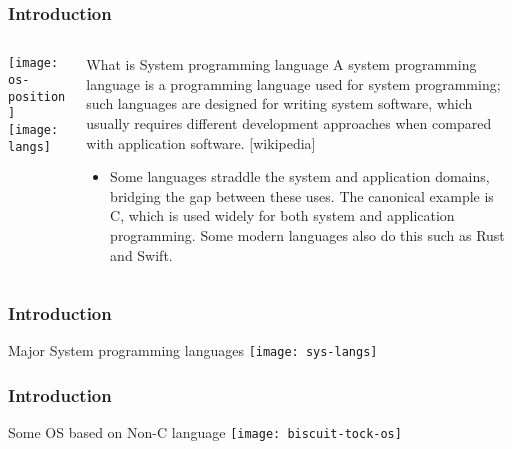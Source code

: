\begin{frame}[plain]
	\frametitle{Introduction}
	
	
	
	\begin{columns}
		
		\begin{column}{.4\textwidth}
			
			\texttt{[image: os-position]}
			\texttt{[image: langs]}
		\end{column}
		
		\begin{column}{.6\textwidth}
			
			\begin{block}{What is System programming language}
				A system programming language is a programming language used for system programming; such languages are designed for writing system software, which usually requires different development approaches when compared with application software.   [wikipedia]
			\end{block} 
			
			
			\begin{itemize}
				\item Some languages straddle the system and application domains, bridging the gap between these uses. The canonical example is C, which is used widely for both system and application programming. Some modern languages also do this such as Rust and Swift.
				
			\end{itemize}
			
			
		\end{column}
		
		
	\end{columns}
	
	
\end{frame}


\begin{frame}[plain]
	\frametitle{Introduction}
	
	\centering
	Major System programming languages
	\texttt{[image: sys-langs]}
\end{frame}

\begin{frame}[plain]
	\frametitle{Introduction}
	
	\centering
	Some OS based on Non-C language
	\texttt{[image: biscuit-tock-os]}
\end{frame}


